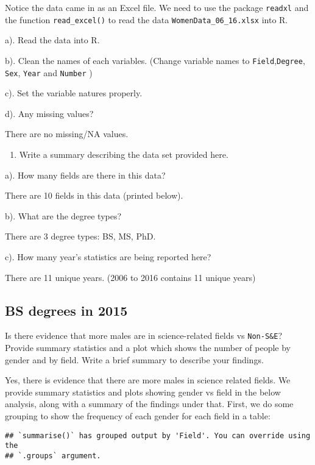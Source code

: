 \documentclass[
]{article}
\providecommand{\tightlist}{%
  \setlength{\itemsep}{0pt}\setlength{\parskip}{0pt}}
\begin{document}
Notice the data came in as an Excel file. We need to use the package
\texttt{readxl} and the function \texttt{read\_excel()} to read the data
\texttt{WomenData\_06\_16.xlsx} into R.

a). Read the data into R.

b). Clean the names of each variables. (Change variable names to
\texttt{Field},\texttt{Degree}, \texttt{Sex}, \texttt{Year} and
\texttt{Number} )

c). Set the variable natures properly.

d). Any missing values?

There are no missing/NA values.

\begin{enumerate}
\def\labelenumi{\arabic{enumi}.}
\setcounter{enumi}{1}
\tightlist
\item
  Write a summary describing the data set provided here.
\end{enumerate}

a). How many fields are there in this data?

There are 10 fields in this data (printed below).

b). What are the degree types?

There are 3 degree types: BS, MS, PhD.

c). How many year's statistics are being reported here?

There are 11 unique years. (2006 to 2016 contains 11 unique years)

\hypertarget{bs-degrees-in-2015}{%
\subsection{BS degrees in 2015}\label{bs-degrees-in-2015}}

Is there evidence that more males are in science-related fields vs
\texttt{Non-S\&E}? Provide summary statistics and a plot which shows the
number of people by gender and by field. Write a brief summary to
describe your findings.

Yes, there is evidence that there are more males in science related
fields. We provide summary statistics and plots showing gender vs field
in the below analysis, along with a summary of the findings under that.
First, we do some grouping to show the frequency of each gender for each
field in a table:

\begin{verbatim}
## `summarise()` has grouped output by 'Field'. You can override using the
## `.groups` argument.
\end{verbatim}
\end{document}
